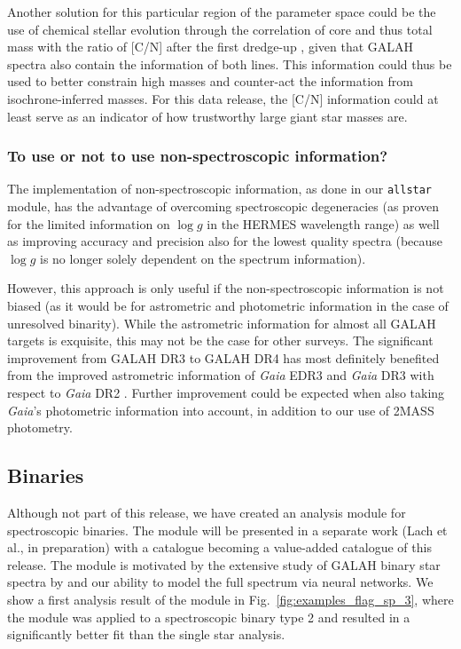 \documentclass[
  journal=pasa,
  manuscript=research-paper, %
  year=2024,
  volume=37
]{cup-journal}
\newcommand{\logg}{$\log g$\xspace}
\begin{document}
Another solution for this particular region of the parameter space could be the use of chemical stellar evolution through the correlation of core and thus total mass with the ratio of [C/N] after the first dredge-up \citep{Masseron2015, Martig2016}, given that GALAH spectra also contain the information of both lines. This information could thus be used to better constrain high masses and counter-act the information from isochrone-inferred masses. For this data release, the [C/N] information could at least serve as an indicator of how trustworthy large giant star masses are.

\subsubsection{To use or not to use non-spectroscopic information?}

The implementation of non-spectroscopic information, as done in our \texttt{allstar} module, has the advantage of overcoming spectroscopic degeneracies (as proven for the limited information on \logg in the HERMES wavelength range) as well as improving accuracy and precision also for the lowest quality spectra (because \logg is no longer solely dependent on the spectrum information).

However, this approach is only useful if the non-spectroscopic information is not biased (as it would be for astrometric and photometric information in the case of unresolved binarity). While the astrometric information for almost all GALAH targets is exquisite, this may not be the case for other surveys. The significant improvement from GALAH DR3 to GALAH DR4 has most definitely benefited from the improved astrometric information of \textit{Gaia} EDR3 \citep{GaiaEDR3, Lindegren2021a} and \textit{Gaia} DR3 \citep{GaiaDR3} with respect to \textit{Gaia} DR2 \citep{Brown2018, Lindegren2018}. Further improvement could be expected when also taking \textit{Gaia}'s photometric information into account, in addition to our use of 2MASS photometry.

\subsection{Binaries} \label{sec:caveats_binaries}

Although not part of this release, we have created an analysis module for spectroscopic binaries. The module will be presented in a separate work (Lach et al., in preparation) with a catalogue becoming a value-added catalogue of this release. The module is motivated by the extensive study of GALAH binary star spectra by \citet{Traven2020} and our ability to model the full spectrum via neural networks. We show a first analysis result of the module in Fig.~\ref{fig:examples_flag_sp_3}, where the module was applied to a spectroscopic binary type 2 and resulted in a significantly better fit than the single star analysis.
\end{document}
